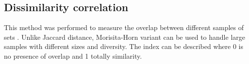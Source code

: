 \documentclass[review]{elsarticle}
\begin{document}
\subsection{Dissimilarity correlation}


This method was performed to measure the overlap between different samples of sets \citep{horn_measurement_1966}. Unlike Jaccard distance, Morisita-Horn variant can be used to handle large samples with different sizes and diversity. The index can be described  where 0 is no presence of overlap and 1 totally similarity. 


\end{document}
